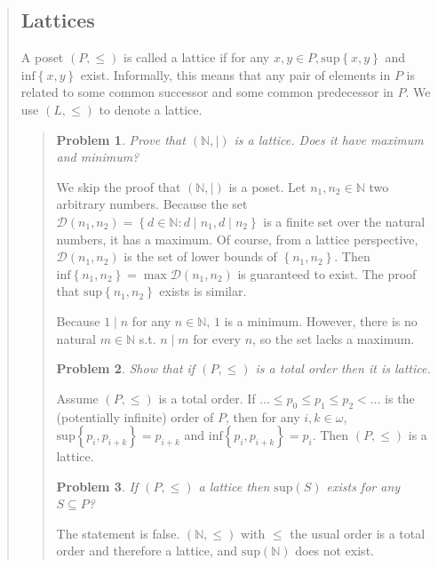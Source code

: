 \documentclass[a4paper, 12pt]{article}
\newtheorem{problem}{Problem}
\newtheorem{problem}{Problem}
\begin{document}
\begin{quote}
\subsection{Lattices}

A poset $(P, \leq) $ is called a lattice if for any $x, y \in P,
\text{sup}\left\{ x, y \right\} $ and $\text{inf}\left\{ x, y \right\} $ exist. Informally, this means that any pair
of elements in $P$ is related to some common successor and some common
predecessor in $P$. We use $(L, \leq)$ to denote a lattice.


\small
\begin{quote}

\begin{problem}
    Prove that $(\mathbb{N}, \mid)$ is a lattice. Does it have maximum and
    minimum?
\end{problem}

We skip the proof that $(\mathbb{N}, \mid)$ is a poset. Let $n_1, n_2 \in \mathbb{N}$ two arbitrary numbers. Because the set
$\mathcal{D}(n_1, n_2) = \left\{ d \in \mathbb{N} : d \mid n_1, d \mid n_2
\right\} $ is a finite set over the natural numbers, it has a maximum. Of
course, from a lattice perspective, $\mathcal{D}(n_1, n_2)$ is the set of lower
bounds of $\left\{n_1, n_2 \right\} $. Then $\text{inf}\left\{ n_1, n_2 \right\}
=\max \mathcal{D}(n_1, n_2)$ is guaranteed to exist. The proof that
$\text{sup}\left\{ n_1, n_2 \right\} $ exists is similar.

Because $1 \mid n$ for any $n \in \mathbb{N}$, $1$ is a minimum. However, there
is no natural $m \in \mathbb{N}$ s.t. $n \mid m$ for every $n$, so the set lacks
a maximum.

\begin{problem}
    Show that if $(P, \leq)$ is a total order then it is lattice.
\end{problem}

   Assume $(P, \leq) $ is a total order. If $\ldots \leq p_0 \leq p_1\leq  p_2 < \ldots$ 
   is the (potentially infinite) order of $P$, then for any 
   $i, k \in \omega$,  $\text{sup}\left\{ p_i, p_{i + k} \right\} = p _{i + k}$
   and $\text{inf}\left\{ p_i, p_{i +k} \right\} = p_i$. Then $(P, \leq) $ is a
   lattice.  

   \begin{problem}
       If $(P, \leq) $ a lattice then $\text{sup}(S)$ exists for any $S
       \subseteq P$?
   \end{problem}

   The statement is false. $(\mathbb{N}, \leq)$ with $\leq$ the usual order is a
   total order and therefore a lattice, and $\text{sup}(\mathbb{N}) $ does not
   exist.


\end{quote}
\end{quote}
\end{document}
